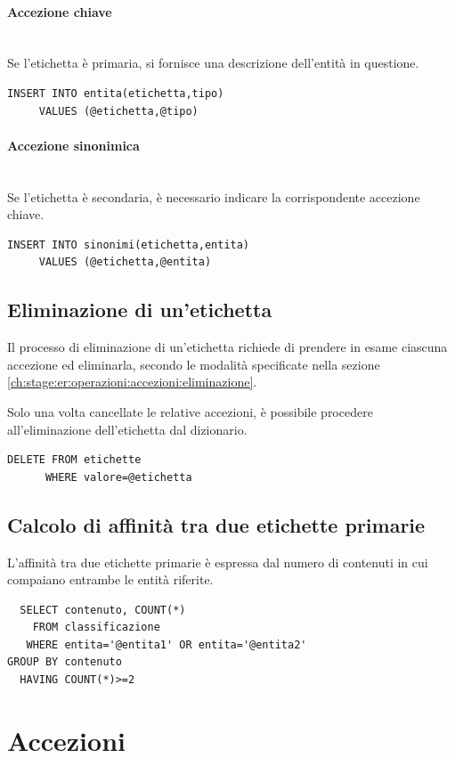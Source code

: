 \documentclass[10pt,a4paper,headinclude,footinclude,hidelinks]{scrreprt} %
\begin{document}
	\paragraph{Accezione chiave} \hfill \\
	Se l'etichetta è primaria, si fornisce una descrizione dell'entità in questione.
\begin{verbatim}
INSERT INTO entita(etichetta,tipo)
     VALUES (@etichetta,@tipo)
\end{verbatim}

	\paragraph{Accezione sinonimica} \hfill \\
	Se l'etichetta è secondaria, è necessario indicare la corrispondente accezione chiave.
\begin{verbatim}
INSERT INTO sinonimi(etichetta,entita)
     VALUES (@etichetta,@entita)
\end{verbatim}

	\subsection{Eliminazione di un'etichetta}
	Il processo di eliminazione di un'etichetta richiede di prendere in esame ciascuna accezione ed eliminarla, secondo le modalità specificate nella sezione \ref{ch:stage:er:operazioni:accezioni:eliminazione}.

	Solo una volta cancellate le relative accezioni, è possibile procedere all'eliminazione dell'etichetta dal dizionario.
\begin{verbatim}
DELETE FROM etichette
      WHERE valore=@etichetta
\end{verbatim}

	\subsection{Calcolo di affinità tra due etichette primarie}
	L'affinità tra due etichette primarie è espressa dal numero di contenuti in cui compaiano entrambe le entità riferite.
\begin{verbatim}
  SELECT contenuto, COUNT(*)
    FROM classificazione
   WHERE entita='@entita1' OR entita='@entita2'
GROUP BY contenuto
  HAVING COUNT(*)>=2
\end{verbatim}

	\section{Accezioni}
	\label{ch:stage:er:operazioni:accezioni}
	
\end{document}
